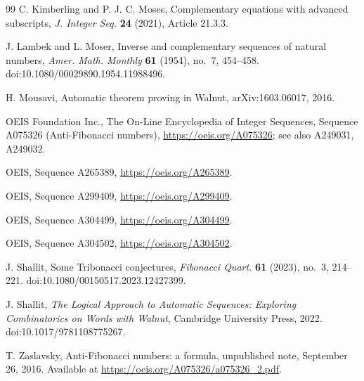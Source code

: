 \documentclass[11pt]{amsart}
\theoremstyle{definition}
\theoremstyle{remark}
\begin{document}
\begin{thebibliography}{99}
C. Kimberling and P. J. C. Moses, Complementary equations with advanced subscripts, \emph{J. Integer Seq.} \textbf{24} (2021), Article 21.3.3.

J. Lambek and L. Moser, Inverse and complementary sequences of natural numbers, \emph{Amer. Math. Monthly} \textbf{61} (1954), no.~7, 454--458. doi:10.1080/00029890.1954.11988496.

H. Mousavi, Automatic theorem proving in Walnut, arXiv:1603.06017, 2016.

OEIS Foundation Inc., The On-Line Encyclopedia of Integer Sequences, Sequence A075326 (Anti-Fibonacci numbers), \url{https://oeis.org/A075326}; see also A249031, A249032.

OEIS, Sequence A265389, \url{https://oeis.org/A265389}.

OEIS, Sequence A299409, \url{https://oeis.org/A299409}.

OEIS, Sequence A304499, \url{https://oeis.org/A304499}.

OEIS, Sequence A304502, \url{https://oeis.org/A304502}.

J. Shallit, Some Tribonacci conjectures, \emph{Fibonacci Quart.} \textbf{61} (2023), no.~3, 214--221. doi:10.1080/00150517.2023.12427399.

J. Shallit, \emph{The Logical Approach to Automatic Sequences: Exploring Combinatorics on Words with Walnut}, Cambridge University Press, 2022. doi:10.1017/9781108775267.

T. Zaslavsky, Anti-Fibonacci numbers: a formula, unpublished note, September 26, 2016. Available at \url{https://oeis.org/A075326/a075326_2.pdf}.

\end{thebibliography}
\end{document}
